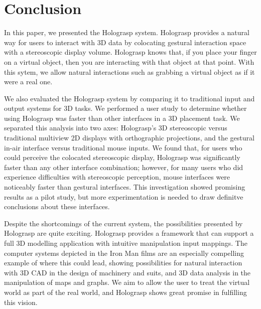 \documentclass[pageno]{jpaper}
\begin{document}
\section{Conclusion}
\label{sec:conclusion}
In this paper, we presented the Holograsp system. Holograsp provides a natural way for users to interact with 3D data by colocating gestural interaction
space with a stereoscopic display volume. Holograsp knows that, if you place your finger on a virtual object, then you are interacting with that object at
that point. With this sytem, we allow natural interactions such as grabbing a virtual object as if it were a real one.

We also evaluated the Holograsp system by comparing it to traditional input and output systems for 3D tasks. We performed a user study to determine whether
using Holograsp was faster than other interfaces in a 3D placement task. We separated this analysis into two axes: Holograsp's 3D stereoscopic
versus traditional multiview 2D displays with orthographic projections, and the gestural in-air interface versus traditional mouse inputs. We
found that, for users who could perceive the colocated stereoscopic display, Holograsp was significantly faster than any other interface combination;
however, for many users who did experience difficulties with stereoscopic perception, mouse interfaces were noticeably faster than gestural interfaces.
This investigation showed promising results as a pilot study, but more experimentation is needed to draw definitve conclusions about these interfaces.

Despite the shortcomings of the current system, the possibilities presented by Holograsp are quite exciting. Holograsp provides a framework that
can support a full 3D modelling application with intuitive manipulation input mappings. The computer systems depicted in the Iron Man films are
an especially compelling example of where this could lead, showing possibilities for natural interaction with 3D CAD in the design of machinery
and suits, and 3D data analysis in the manipulation of maps and graphs. We aim to allow the user to treat the virtual world as part of the real
world, and Holograsp shows great promise in fulfilling this vision.

\newpage
{}


\end{document}
